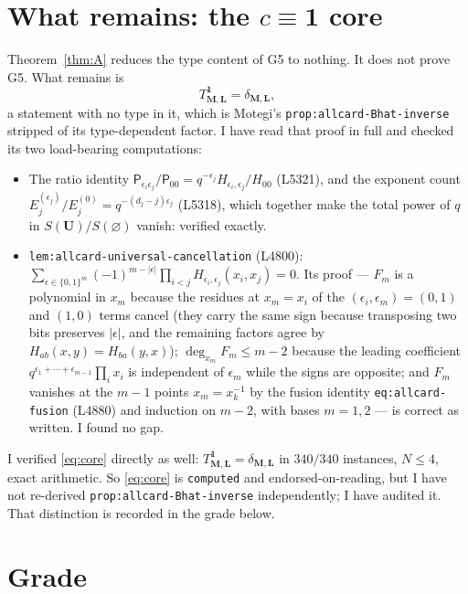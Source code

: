 \documentclass[11pt]{article}
\theoremstyle{plain}
\theoremstyle{definition}
\theoremstyle{remark}
\newcommand{\bM}{\mathbf M}
\newcommand{\bL}{\mathbf L}
\newcommand{\bU}{\mathbf U}
\begin{document}
\section{What remains: the $c\equiv\mathbf 1$ core}
\label{sec:remains}

Theorem~\ref{thm:A} reduces the type content of G5 to nothing. It does not prove
G5. What remains is
\begin{equation}
T^{\mathbf 1}_{\bM,\bL}=\delta_{\bM,\bL},
\label{eq:core}
\end{equation}
a statement with no type in it, which is Motegi's
\texttt{prop:allcard-Bhat-inverse} stripped of its type-dependent factor. I have
read that proof in full and checked its two load-bearing computations:
\begin{itemize}[itemsep=2pt]
\item The ratio identity
$\mathsf P_{\epsilon_i\epsilon_j}/\mathsf P_{00}
=q^{-\epsilon_j}H_{\epsilon_i,\epsilon_j}/H_{00}$ (L5321), and the exponent count
$E^{(\epsilon_j)}_j/E^{(0)}_j=q^{-(d_j-j)\epsilon_j}$ (L5318), which together make
the total power of $q$ in $S(\bU)/S(\varnothing)$ vanish: verified exactly.
\item \texttt{lem:allcard-universal-cancellation} (L4800):
$\sum_{\epsilon\in\{0,1\}^m}(-1)^{m-|\epsilon|}
\prod_{i<j}H_{\epsilon_i,\epsilon_j}(x_i,x_j)=0$. Its proof --- $F_m$ is a
polynomial in $x_m$ because the residues at $x_m=x_i$ of the
$(\epsilon_i,\epsilon_m)=(0,1)$ and $(1,0)$ terms cancel (they carry the same sign
because transposing two bits preserves $|\epsilon|$, and the remaining factors
agree by $H_{ab}(x,y)=H_{ba}(y,x)$); $\deg_{x_m}F_m\le m-2$ because the leading
coefficient $q^{\epsilon_1+\cdots+\epsilon_{m-1}}\prod_i x_i$ is independent of
$\epsilon_m$ while the signs are opposite; and $F_m$ vanishes at the $m-1$ points
$x_m=x_k^{-1}$ by the fusion identity \texttt{eq:allcard-fusion} (L4880) and induction on $m-2$,
with bases $m=1,2$ --- is correct as written. I found no gap.
\end{itemize}

\noindent
I verified \eqref{eq:core} directly as well: $T^{\mathbf 1}_{\bM,\bL}=\delta_{\bM,\bL}$
in $340/340$ instances, $N\le4$, exact arithmetic. So \eqref{eq:core} is
\texttt{computed} and endorsed-on-reading, but I have not re-derived
\texttt{prop:allcard-Bhat-inverse} independently; I have audited it. That
distinction is recorded in the grade below.

\section{Grade}
\label{sec:grade}
\end{document}
